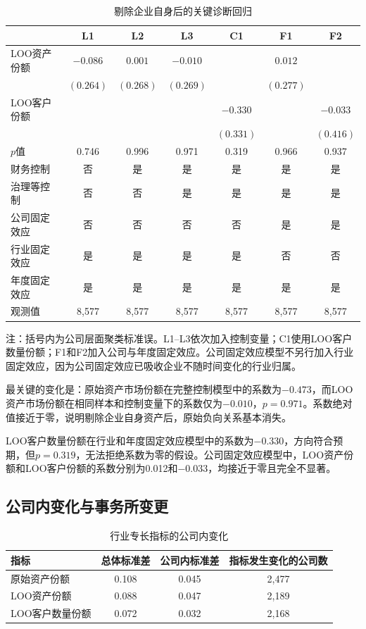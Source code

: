 \documentclass[12pt,a4paper]{article}
\begin{document}
\begin{table}[htbp]
\centering
\caption{剔除企业自身后的关键诊断回归}
\label{tab:loo}
\small
\begin{tabular}{lcccccc}
\toprule
 & L1 & L2 & L3 & C1 & F1 & F2 \\
\midrule
LOO资产份额 & $-0.086$ & $0.001$ & $-0.010$ & & $0.012$ & \\
 & $(0.264)$ & $(0.268)$ & $(0.269)$ & & $(0.277)$ & \\
LOO客户份额 & & & & $-0.330$ & & $-0.033$ \\
 & & & & $(0.331)$ & & $(0.416)$ \\
$p$值 & 0.746 & 0.996 & 0.971 & 0.319 & 0.966 & 0.937 \\
财务控制 & 否 & 是 & 是 & 是 & 是 & 是 \\
治理等控制 & 否 & 否 & 是 & 是 & 是 & 是 \\
公司固定效应 & 否 & 否 & 否 & 否 & 是 & 是 \\
行业固定效应 & 是 & 是 & 是 & 是 & 否 & 否 \\
年度固定效应 & 是 & 是 & 是 & 是 & 是 & 是 \\
观测值 & 8,577 & 8,577 & 8,577 & 8,577 & 8,577 & 8,577 \\
\bottomrule
\end{tabular}

\begin{minipage}{0.96\textwidth}
\footnotesize 注：括号内为公司层面聚类标准误。L1--L3依次加入控制变量；C1使用LOO客户数量份额；F1和F2加入公司与年度固定效应。公司固定效应模型不另行加入行业固定效应，因为公司固定效应已吸收企业不随时间变化的行业归属。
\end{minipage}
\end{table}

最关键的变化是：原始资产市场份额在完整控制模型中的系数为$-0.473$，而LOO资产市场份额在相同样本和控制变量下的系数仅为$-0.010$，$p=0.971$。系数绝对值接近于零，说明剔除企业自身资产后，原始负向关系基本消失。

LOO客户数量份额在行业和年度固定效应模型中的系数为$-0.330$，方向符合预期，但$p=0.319$，无法拒绝系数为零的假设。公司固定效应模型中，LOO资产份额和LOO客户份额的系数分别为0.012和$-0.033$，均接近于零且完全不显著。

\subsection{公司内变化与事务所变更}

\begin{table}[htbp]
\centering
\caption{行业专长指标的公司内变化}
\label{tab:variation}
\small
\begin{tabular}{lccc}
\toprule
指标 & 总体标准差 & 公司内标准差 & 指标发生变化的公司数 \\
\midrule
原始资产份额 & 0.108 & 0.045 & 2,477 \\
LOO资产份额 & 0.088 & 0.047 & 2,189 \\
LOO客户数量份额 & 0.072 & 0.032 & 2,168 \\
\bottomrule
\end{tabular}
\end{table}
\end{document}
